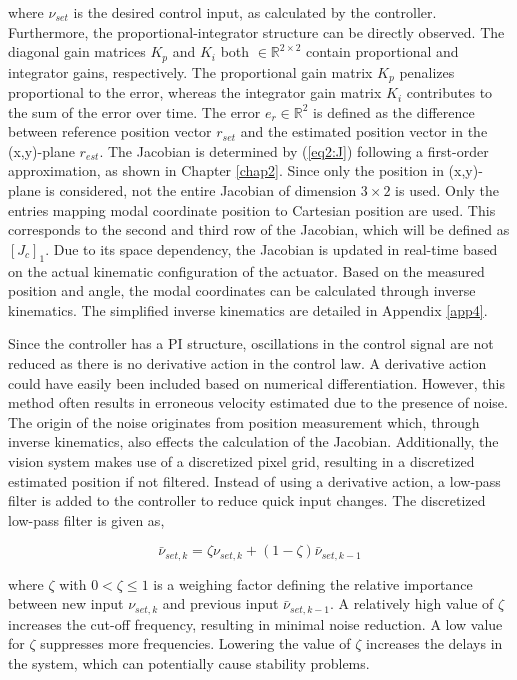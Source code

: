 where $\nu_{set}$ is the desired control input, as calculated by the controller. Furthermore, the proportional-integrator structure can be directly observed. The diagonal gain matrices $K_p$ and $K_i$ both  $ \in \mathbb{R}^{2\times 2}$ contain proportional and integrator gains, respectively. The proportional gain matrix $K_p$ penalizes proportional to the error, whereas the integrator gain matrix $K_i$ contributes to the sum of the error over time. The error $e_r \in \mathbb{R}^2$ is defined as the difference between reference position vector $r_{set}$ and the estimated position vector in the (x,y)-plane $r_{est}$. The Jacobian is determined by (\ref{eq2:J}) following a first-order approximation, as shown in Chapter \ref{chap2}. Since only the position in (x,y)-plane is considered, not the entire Jacobian of dimension $3 \times 2$ is used. Only the entries mapping modal coordinate position to Cartesian position are used. This corresponds to the second and third row of the Jacobian, which will be defined as $[J_c]_1$. Due to its space dependency, the Jacobian is updated in real-time based on the actual kinematic configuration of the actuator. Based on the measured position and angle, the modal coordinates can be calculated through inverse kinematics. The simplified inverse kinematics are detailed in Appendix \ref{app4}.

Since the controller has a PI structure, oscillations in the control signal are not reduced as there is no derivative action in the control law. A derivative action could have easily been included based on numerical differentiation. However, this method often results in erroneous velocity estimated due to the presence of noise. The origin of the noise originates from position measurement which, through inverse kinematics, also effects the calculation of the Jacobian. Additionally, the vision system makes use of a discretized pixel grid, resulting in a discretized estimated position if not filtered. Instead of using a derivative action, a low-pass filter is added to the controller to reduce quick input changes. The discretized low-pass filter is given as,

\begin{equation}
\bar{\nu}_{set,k} = \zeta \nu_{set,k} + (1-\zeta)\bar{\nu}_{set,k-1}
\label{eq4:lowpass}
\end{equation}

where $\zeta$ with $ 0 < \zeta \leq 1$ is a weighing factor defining the relative importance between new input $\nu_{set,k}$ and previous input $\bar{\nu}_{set,k-1}$. A relatively high value of $\zeta$ increases the cut-off frequency, resulting in minimal noise reduction. A low value for $\zeta$ suppresses more frequencies. Lowering the value of $\zeta$ increases the delays in the system, which can potentially cause stability problems. 


